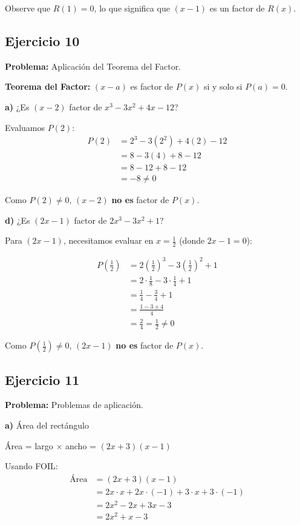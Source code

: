 Observe que $R(1) = 0$, lo que significa que $(x - 1)$ es un factor de $R(x)$.

\subsection*{Ejercicio 10}

\textbf{Problema:} Aplicación del Teorema del Factor.

\textbf{Teorema del Factor:} $(x - a)$ es factor de $P(x)$ si y solo si $P(a) = 0$.

\textbf{a)} ¿Es $(x - 2)$ factor de $x^3 - 3x^2 + 4x - 12$?

Evaluamos $P(2)$:
\begin{align}
P(2) &= 2^3 - 3(2^2) + 4(2) - 12\\
&= 8 - 3(4) + 8 - 12\\
&= 8 - 12 + 8 - 12\\
&= -8 \neq 0
\end{align}

Como $P(2) \neq 0$, $(x - 2)$ \textbf{no es} factor de $P(x)$.

\textbf{d)} ¿Es $(2x - 1)$ factor de $2x^3 - 3x^2 + 1$?

Para $(2x - 1)$, necesitamos evaluar en $x = \frac{1}{2}$ (donde $2x - 1 = 0$):

\begin{align}
P\left(\frac{1}{2}\right) &= 2\left(\frac{1}{2}\right)^3 - 3\left(\frac{1}{2}\right)^2 + 1\\
&= 2 \cdot \frac{1}{8} - 3 \cdot \frac{1}{4} + 1\\
&= \frac{1}{4} - \frac{3}{4} + 1\\
&= \frac{1 - 3 + 4}{4}\\
&= \frac{2}{4} = \frac{1}{2} \neq 0
\end{align}

Como $P(\frac{1}{2}) \neq 0$, $(2x - 1)$ \textbf{no es} factor de $P(x)$.

\subsection*{Ejercicio 11}

\textbf{Problema:} Problemas de aplicación.

\textbf{a)} Área del rectángulo

Área = largo × ancho = $(2x + 3)(x - 1)$

Usando FOIL:
\begin{align}
\text{Área} &= (2x + 3)(x - 1)\\
&= 2x \cdot x + 2x \cdot (-1) + 3 \cdot x + 3 \cdot (-1)\\
&= 2x^2 - 2x + 3x - 3\\
&= 2x^2 + x - 3
\end{align}

